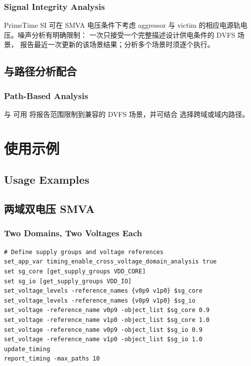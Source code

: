\subsubsection*{Signal Integrity Analysis}

PrimeTime SI 可在 SMVA 电压条件下考虑 aggressor 与 victim 的相应电源轨电压。噪声分析有明确限制： 一次只接受一个完整描述设计供电条件的 DVFS 场景， 报告最近一次更新的该场景结果；分析多个场景时须逐个执行。

\subsection{与路径分析配合}
\subsubsection*{Path-Based Analysis}

 与  可用  将报告范围限制到兼容的 DVFS 场景，并可结合  选择跨域或域内路径。

\section{使用示例}
\subsection*{Usage Examples}

\subsection{两域双电压 SMVA}
\subsubsection*{Two Domains, Two Voltages Each}

\begin{lstlisting}
# Define supply groups and voltage references
set_app_var timing_enable_cross_voltage_domain_analysis true
set sg_core [get_supply_groups VDD_CORE]
set sg_io [get_supply_groups VDD_IO]
set_voltage_levels -reference_names {v0p9 v1p0} $sg_core
set_voltage_levels -reference_names {v0p9 v1p0} $sg_io
set_voltage -reference_name v0p9 -object_list $sg_core 0.9
set_voltage -reference_name v1p0 -object_list $sg_core 1.0
set_voltage -reference_name v0p9 -object_list $sg_io 0.9
set_voltage -reference_name v1p0 -object_list $sg_io 1.0
update_timing
report_timing -max_paths 10
\end{lstlisting}

